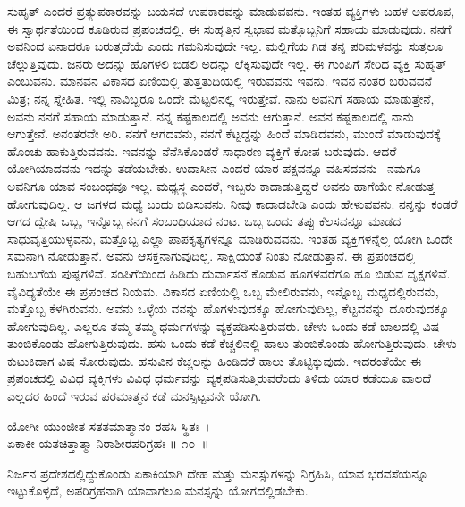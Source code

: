 ಸುಹೃತ್ ಎಂದರೆ ಪ್ರತ್ಯುಪಕಾರವನ್ನು ಬಯಸದೆ ಉಪಕಾರವನ್ನು ಮಾಡುವವನು. ಇಂತಹ ವ್ಯಕ್ತಿಗಳು ಬಹಳ ಅಪರೂಪ, ಈ ಸ್ವಾರ್ಥತೆಯಿಂದ ಕೂಡಿರುವ ಪ್ರಪಂಚದಲ್ಲಿ. ಈ ಸುಹೃತ್ತಿನ ಸ್ವಭಾವ ಮತ್ತೊಬ್ಬನಿಗೆ ಸಹಾಯ ಮಾಡುವುದು. ನನಗೆ ಅವನಿಂದ ಏನಾದರೂ ಬರುತ್ತದೆಯೆ ಎಂದು ಗಮನಿಸುವುದೇ ಇಲ್ಲ. ಮಲ್ಲಿಗೆಯ ಗಿಡ ತನ್ನ ಪರಿಮಳವನ್ನು ಸುತ್ತಲೂ ಚೆಲ್ಲುತ್ತಿವುದು. ಜನರು ಅದನ್ನು ಹೊಗಳಲಿ ಬಿಡಲಿ ಅದನ್ನು ಲೆಕ್ಕಿಸುವುದೇ ಇಲ್ಲ. ಈ ಗುಂಪಿಗೆ ಸೇರಿದ ವ್ಯಕ್ತಿ ಸುಹೃತ್ ಎಂಬುವನು. ಮಾನವನ ವಿಕಾಸದ ಏಣಿಯಲ್ಲಿ ತುತ್ತತುದಿಯಲ್ಲಿ ಇರುವವನು ಇವನು. ಇವನ ನಂತರ ಬರುವವನೆ ಮಿತ್ರ; ನನ್ನ ಸ್ನೇಹಿತ. ಇಲ್ಲಿ ನಾವಿಬ್ಬರೂ ಒಂದೇ ಮೆಟ್ಟಲಿನಲ್ಲಿ ಇರುತ್ತೇವೆ. ನಾನು ಅವನಿಗೆ ಸಹಾಯ ಮಾಡುತ್ತೇನೆ, ಅವನು ನನಗೆ ಸಹಾಯ ಮಾಡುತ್ತಾನೆ. ನನ್ನ ಕಷ್ಟಕಾಲದಲ್ಲಿ ಅವನು ಆಗುತ್ತಾನೆ. ಅವನ ಕಷ್ಟಕಾಲದಲ್ಲಿ ನಾನು ಆಗುತ್ತೇನೆ. ಅನಂತರವೇ ಅರಿ. ನನಗೆ ಆಗದವನು, ನನಗೆ ಕೆಟ್ಟದ್ದನ್ನು ಹಿಂದೆ ಮಾಡಿದವನು, ಮುಂದೆ ಮಾಡುವುದಕ್ಕೆ ಹೊಂಚು ಹಾಕುತ್ತಿರುವವನು. ಇವನನ್ನು ನೆನೆಸಿಕೊಂಡರೆ ಸಾಧಾರಣ ವ್ಯಕ್ತಿಗೆ ಕೋಪ ಬರುವುದು. ಆದರೆ ಯೋಗಿಯಾದವನು ಇದನ್ನು ತಡೆಯಬೇಕು. ಉದಾಸೀನ ಎಂದರೆ ಯಾರ ಪಕ್ಷವನ್ನೂ ವಹಿಸದವನು –ನಮಗೂ ಅವನಿಗೂ ಯಾವ ಸಂಬಂಧವೂ ಇಲ್ಲ. ಮಧ್ಯಸ್ಥ ಎಂದರೆ, ಇಬ್ಬರು ಕಾದಾಡುತ್ತಿದ್ದರೆ ಅವನು ಹಾಗೆಯೇ ನೋಡುತ್ತ ಹೋಗುವುದಿಲ್ಲ. ಆ ಜಗಳದ ಮಧ್ಯೆ ಬಂದು ಬಿಡಿಸುವನು. ನೀವು ಕಾದಾಡಬೇಡಿ ಎಂದು ಹೇಳುವವನು. ನನ್ನನ್ನು ಕಂಡರೆ ಆಗದ ದ್ವೇಷಿ ಒಬ್ಬ, ಇನ್ನೊಬ್ಬ ನನಗೆ ಸಂಬಂಧಿಯಾದ ನಂಟ. ಒಬ್ಬ ಒಂದು ತಪ್ಪು ಕೆಲಸವನ್ನೂ ಮಾಡದ ಸಾಧುವೃತ್ತಿಯುಳ್ಳವನು, ಮತ್ತೊಬ್ಬ ಎಲ್ಲಾ ಪಾಪಕೃತ್ಯಗಳನ್ನೂ ಮಾಡಿರುವವನು. ಇಂತಹ ವ್ಯಕ್ತಿಗಳನ್ನೆಲ್ಲ ಯೋಗಿ ಒಂದೇ ಸಮನಾಗಿ ನೋಡುತ್ತಾನೆ. ಅವನು ಆಸಕ್ತನಾಗುವುದಿಲ್ಲ. ಸಾಕ್ಷಿಯಂತೆ ನಿಂತು ನೋಡುತ್ತಾನೆ. ಈ ಪ್ರಪಂಚದಲ್ಲಿ ಬಹುಬಗೆಯ ಪುಷ್ಪಗಳಿವೆ. ಸಂಪಿಗೆಯಿಂದ ಹಿಡಿದು ದುರ್ವಾಸನೆ ಕೊಡುವ ಹೂಗಳವರೆಗೂ ಹೂ ಬಿಡುವ ವೃಕ್ಷಗಳಿವೆ. ವೈವಿಧ್ಯತೆಯೇ ಈ ಪ್ರಪಂಚದ ನಿಯಮ. ವಿಕಾಸದ ಏಣಿಯಲ್ಲಿ ಒಬ್ಬ ಮೇಲಿರುವನು, ಇನ್ನೊಬ್ಬ ಮಧ್ಯದಲ್ಲಿರುವನು, ಮತ್ತೊಬ್ಬ ಕೆಳಗಿರುವನು. ಅವನು ಒಳ್ಳೆಯ ವನನ್ನು ಹೊಗಳುವುದಕ್ಕೂ ಹೋಗುವುದಿಲ್ಲ, ಕೆಟ್ಟವನನ್ನು ದೂರುವುದಕ್ಕೂ ಹೋಗುವುದಿಲ್ಲ. ಎಲ್ಲರೂ ತಮ್ಮ ತಮ್ಮ ಧರ್ಮಗಳನ್ನು ವ್ಯಕ್ತಪಡಿಸುತ್ತಿರುವರು. ಚೇಳು ಒಂದು ಕಡೆ ಬಾಲದಲ್ಲಿ ವಿಷ ತುಂಬಿಕೊಂಡು ಹೋಗುತ್ತಿರುವುದು. ಹಸು ಒಂದು ಕಡೆ ಕೆಚ್ಚಲಿನಲ್ಲಿ ಹಾಲು ತುಂಬಿಕೊಂಡು ಹೋಗುತ್ತಿರುವುದು. ಚೇಳು ಕುಟುಕಿದಾಗ ವಿಷ ಸೋರುವುದು. ಹಸುವಿನ ಕೆಚ್ಚಲನ್ನು ಹಿಂಡಿದರೆ ಹಾಲು ತೊಟ್ಟಿಕ್ಕುವುದು. ಇದರಂತೆಯೇ ಈ ಪ್ರಪಂಚದಲ್ಲಿ ವಿವಿಧ ವ್ಯಕ್ತಿಗಳು ವಿವಿಧ ಧರ್ಮವನ್ನು ವ್ಯಕ್ತಪಡಿಸುತ್ತಿರುವರೆಂದು ತಿಳಿದು ಯಾರ ಕಡೆಯೂ ವಾಲದೆ ಎಲ್ಲದರ ಹಿಂದೆ ಇರುವ ಪರಮಾತ್ಮನ ಕಡೆ ಮನಸ್ಸಿಟ್ಟವನೇ ಯೋಗಿ.

\begin{shloka}
ಯೋಗೀ ಯುಂಜೀತ ಸತತಮಾತ್ಮಾನಂ ರಹಸಿ ಸ್ಥಿತಃ~।\\ಏಕಾಕೀ ಯತಚಿತ್ತಾತ್ಮಾ ನಿರಾಶೀರಪರಿಗ್ರಹಃ \hfill॥ ೧೦~॥
\end{shloka}

\begin{artha}
ನಿರ್ಜನ ಪ್ರದೇಶದಲ್ಲಿದ್ದುಕೊಂಡು ಏಕಾಕಿಯಾಗಿ ದೇಹ ಮತ್ತು ಮನಸ್ಸುಗಳನ್ನು ನಿಗ್ರಹಿಸಿ, ಯಾವ ಭರವಸೆಯನ್ನೂ ಇಟ್ಟುಕೊಳ್ಳದೆ, ಅಪರಿಗ್ರಹನಾಗಿ ಯಾವಾಗಲೂ ಮನಸ್ಸನ್ನು ಯೋಗದಲ್ಲಿಡಬೇಕು.
\end{artha}

